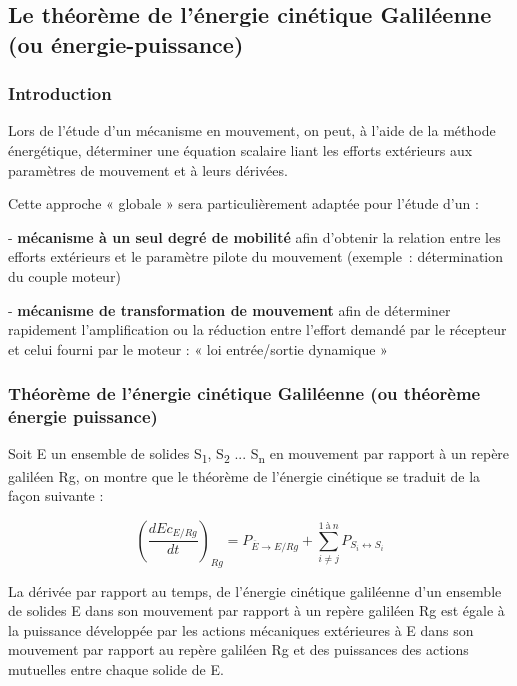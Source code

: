 \hypertarget{le-thuxe9oruxe8me-de-luxe9nergie-cinuxe9tique-galiluxe9enne-ou-uxe9nergie-puissance}{%
\subsection{Le théorème de l'énergie cinétique Galiléenne (ou énergie-puissance)}\label{le-thuxe9oruxe8me-de-luxe9nergie-cinuxe9tique-galiluxe9enne-ou-uxe9nergie-puissance}}

\hypertarget{introduction-1}{%
\subsubsection{Introduction}\label{introduction-1}}

Lors de l'étude d'un mécanisme en mouvement, on peut, à l'aide de la méthode énergétique, déterminer une équation scalaire liant les efforts extérieurs aux paramètres de mouvement et à leurs dérivées.

Cette approche « globale » sera particulièrement adaptée pour l'étude d'un :

- \textbf{mécanisme à un seul degré de mobilité} afin d'obtenir la relation entre les efforts extérieurs et le paramètre pilote du mouvement (exemple~: détermination du couple moteur)

- \textbf{mécanisme de transformation de mouvement} afin de déterminer rapidement l'amplification ou la réduction entre l'effort demandé par le récepteur et celui fourni par le moteur : « loi entrée/sortie dynamique »

\hypertarget{thuxe9oruxe8me-de-luxe9nergie-cinuxe9tique-galiluxe9enne-ou-thuxe9oruxe8me-uxe9nergie-puissance}{%
\subsubsection{Théorème de l'énergie cinétique Galiléenne (ou théorème énergie puissance)}\label{thuxe9oruxe8me-de-luxe9nergie-cinuxe9tique-galiluxe9enne-ou-thuxe9oruxe8me-uxe9nergie-puissance}}

Soit E un ensemble de solides S\textsubscript{1}, S\textsubscript{2} ... S\textsubscript{n} en mouvement par rapport à un repère galiléen Rg, on montre que le théorème de l'énergie cinétique se traduit de la façon suivante :

\[\left( \frac{{dEc}_{E/Rg}}{dt} \right)_{Rg} = P_{\overline{E} \rightarrow E/Rg} + \sum_{i \neq j}^{1\ à\ n}P_{S_{i} \leftrightarrow S_{i}}\]

La dérivée par rapport au temps, de l'énergie cinétique galiléenne d'un ensemble de solides E dans son mouvement par rapport à un repère galiléen Rg est égale à la puissance développée par les actions mécaniques extérieures à E dans son mouvement par rapport au repère galiléen Rg et des puissances des actions mutuelles entre chaque solide de E.

